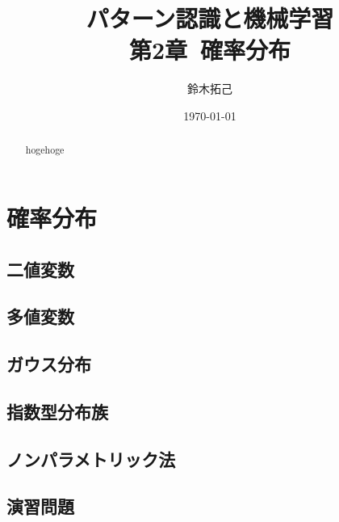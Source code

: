 \documentclass[uplatex,a4paper,oneside,openany,dvipdfmx]{jsarticle}
\title{パターン認識と機械学習\\第2章\ 確率分布}
\author{鈴木拓己}
\date{\today}
\numberwithin{equation}{section}
\theoremstyle{mystyle} %
\begin{document}
\maketitle
\setcounter{tocdepth}{3}

\tableofcontents

\begin{abstract}
    hogehoge
\end{abstract}

\setcounter{section}{1}
\section{確率分布}

\subsection{二値変数}

\subsection{多値変数}

\subsection{ガウス分布}

\subsection{指数型分布族}

\subsection{ノンパラメトリック法}

\subsection{演習問題}
\end{document}
